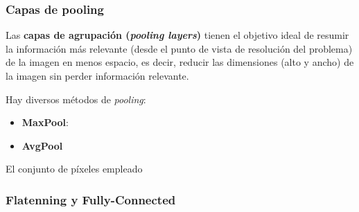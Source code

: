 

\subsubsection{Capas de pooling}

Las \textbf{capas de agrupación (\textit{pooling layers})} tienen el objetivo ideal de resumir la información 
más relevante (desde el punto de vista de resolución del problema) de la imagen en menos espacio, es decir,
reducir las dimensiones (alto y ancho) de la imagen sin perder información relevante.



Hay diversos métodos de \textit{pooling}:

\begin{itemize}

    \item \textbf{MaxPool}:

    \item \textbf{AvgPool}

\end{itemize}

El conjunto de píxeles empleado 




\subsubsection{Flatenning y Fully-Connected}







